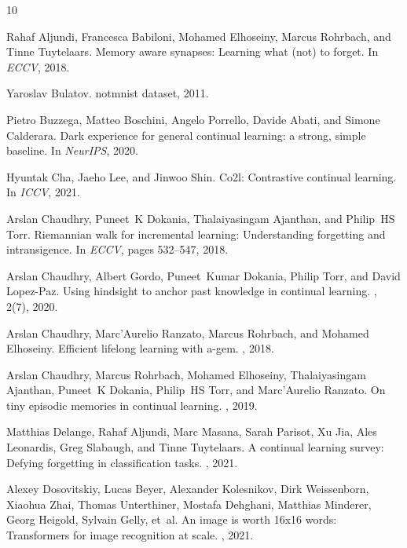 \documentclass[10pt,twocolumn,letterpaper]{article}
\begin{document}
\begin{thebibliography}{10}\itemsep=-1pt

Rahaf Aljundi, Francesca Babiloni, Mohamed Elhoseiny, Marcus Rohrbach, and
  Tinne Tuytelaars.
\newblock Memory aware synapses: Learning what (not) to forget.
\newblock In {\em ECCV}, 2018.

Yaroslav Bulatov.
\newblock notmnist dataset, 2011.

Pietro Buzzega, Matteo Boschini, Angelo Porrello, Davide Abati, and Simone
  Calderara.
\newblock Dark experience for general continual learning: a strong, simple
  baseline.
\newblock In {\em NeurIPS}, 2020.

Hyuntak Cha, Jaeho Lee, and Jinwoo Shin.
\newblock Co2l: Contrastive continual learning.
\newblock In {\em ICCV}, 2021.

Arslan Chaudhry, Puneet~K Dokania, Thalaiyasingam Ajanthan, and Philip~HS Torr.
\newblock Riemannian walk for incremental learning: Understanding forgetting
  and intransigence.
\newblock In {\em ECCV}, pages 532--547, 2018.

Arslan Chaudhry, Albert Gordo, Puneet~Kumar Dokania, Philip Torr, and David
  Lopez-Paz.
\newblock Using hindsight to anchor past knowledge in continual learning.
, 2(7), 2020.

Arslan Chaudhry, Marc'Aurelio Ranzato, Marcus Rohrbach, and Mohamed Elhoseiny.
\newblock Efficient lifelong learning with a-gem.
, 2018.

Arslan Chaudhry, Marcus Rohrbach, Mohamed Elhoseiny, Thalaiyasingam Ajanthan,
  Puneet~K Dokania, Philip~HS Torr, and Marc'Aurelio Ranzato.
\newblock On tiny episodic memories in continual learning.
, 2019.

Matthias Delange, Rahaf Aljundi, Marc Masana, Sarah Parisot, Xu Jia, Ales
  Leonardis, Greg Slabaugh, and Tinne Tuytelaars.
\newblock A continual learning survey: Defying forgetting in classification
  tasks.
, 2021.

Alexey Dosovitskiy, Lucas Beyer, Alexander Kolesnikov, Dirk Weissenborn,
  Xiaohua Zhai, Thomas Unterthiner, Mostafa Dehghani, Matthias Minderer, Georg
  Heigold, Sylvain Gelly, et~al.
\newblock An image is worth 16x16 words: Transformers for image recognition at
  scale.
, 2021.


\end{thebibliography}
\end{document}

